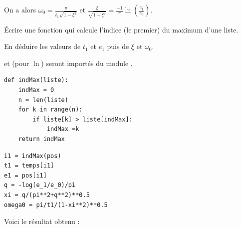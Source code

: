 On a alors $\displaystyle \omega_0 = \frac{\pi}{t_1\sqrt{1-\xi^2}}$ et $\displaystyle \frac{\xi}{\sqrt{1-\xi^2}}=\frac {-1}\pi\ln\left(\frac{e_1}{e_0}\right)$.
\begin{Exercise}\it 

Écrire une fonction qui calcule l'indice (le premier) du maximum d'une liste.

En déduire les valeurs de $t_1$ et $e_1$ puis de $\xi$ et $\omega_0$.

 et  (pour $\ln$) seront importés du module .
\end{Exercise}
\begin{Answer}
\begin{lstlisting}
def indMax(liste):
    indMax = 0
    n = len(liste)
    for k in range(n):
        if liste[k] > liste[indMax]:
            indMax =k
    return indMax
\end{lstlisting}

\begin{lstlisting}
i1 = indMax(pos)
t1 = temps[i1]
e1 = pos[i1]
q = -log(e_1/e_0)/pi
xi = q/(pi**2+q**2)**0.5
omega0 = pi/t1/(1-xi**2)**0.5
\end{lstlisting}
\newpage
\end{Answer}
\medskip

Voici le résultat obtenu :

